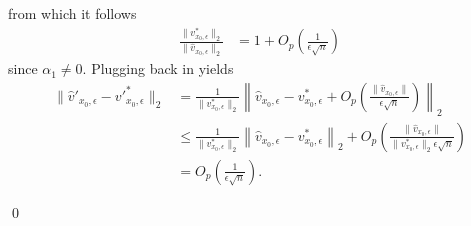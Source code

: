 \documentclass[11pt]{article}
\begin{document}
from which it follows
\begin{align}
    \frac{\|v^*_{x_0, \epsilon}\|_2}{\|\hat{v}_{x_0, \epsilon}\|_2} &= 1 + O_p\left(\frac{1}{\epsilon\sqrt{n}}\right)
\end{align}
since $\alpha_1 \neq 0$. Plugging back in yields
\begin{align}
    \|\hat{v}'_{x_0, \epsilon} - v'^*_{x_0, \epsilon}\|_2 &=  \frac{1}{\|v^*_{x_0, \epsilon}\|_2}\left\|\hat{v}_{x_0, \epsilon} - v^*_{x_0, \epsilon} + O_p\left(\frac{\|\hat{v}_{x_0, \epsilon}\|}{\epsilon\sqrt{n}}\right)\right\|_2 \\
    &\leq \frac{1}{\|v^*_{x_0, \epsilon}\|_2}\left\|\hat{v}_{x_0, \epsilon} - v^*_{x_0, \epsilon} \right\|_2 + O_p\left(\frac{\|\hat{v}_{x_0, \epsilon}\|}{\|v^*_{x_0, \epsilon}\|_2\epsilon\sqrt{n}}\right) \\
    &= O_p\left(\frac{1}{\epsilon\sqrt{n}}\right) .
\end{align}

\qed{}
\end{document}
